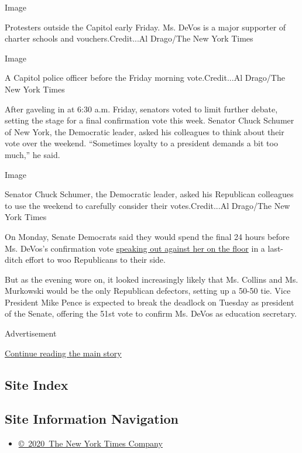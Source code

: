 Image

Protesters outside the Capitol early Friday. Ms. DeVos is a major
supporter of charter schools and vouchers.Credit...Al Drago/The New York
Times

Image

A Capitol police officer before the Friday morning vote.Credit...Al
Drago/The New York Times

After gaveling in at 6:30 a.m. Friday, senators voted to limit further
debate, setting the stage for a final confirmation vote this week.
Senator Chuck Schumer of New York, the Democratic leader, asked his
colleagues to think about their vote over the weekend. ``Sometimes
loyalty to a president demands a bit too much,'' he said.

Image

Senator Chuck Schumer, the Democratic leader, asked his Republican
colleagues to use the weekend to carefully consider their
votes.Credit...Al Drago/The New York Times

On Monday, Senate Democrats said they would spend the final 24 hours
before Ms. DeVos's confirmation vote
\href{https://www.nytimes.com/2017/02/06/us/politics/betsy-devos-democrats-education.html}{speaking
out against her on the floor} in a last-ditch effort to woo Republicans
to their side.

But as the evening wore on, it looked increasingly likely that Ms.
Collins and Ms. Murkowski would be the only Republican defectors,
setting up a 50-50 tie. Vice President Mike Pence is expected to break
the deadlock on Tuesday as president of the Senate, offering the 51st
vote to confirm Ms. DeVos as education secretary.

Advertisement

\protect\hyperlink{after-bottom}{Continue reading the main story}

\hypertarget{site-index}{%
\subsection{Site Index}\label{site-index}}

\hypertarget{site-information-navigation}{%
\subsection{Site Information
Navigation}\label{site-information-navigation}}

\begin{itemize}
\tightlist
\item
  \href{https://help.nytimes.com/hc/en-us/articles/115014792127-Copyright-notice}{©~2020~The
  New York Times Company}
\end{itemize}

